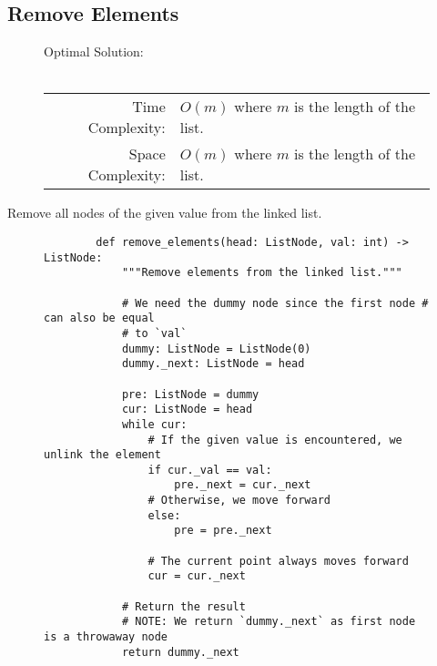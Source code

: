 
\subsection{Remove Elements}

\begin{figure}[H]
    Optimal Solution:\\\\
    \begin{tabular}{rl}
        Time Complexity:& \(O(m)\) where \(m\) is the length of the list.\\
        Space Complexity:& \(O(m)\) where \(m\) is the length of the list.
    \end{tabular}
\end{figure}

Remove all nodes of the given value from the linked list.

\begin{figure}[H]
    \centering
    \begin{verbatim}
        def remove_elements(head: ListNode, val: int) -> ListNode:
            """Remove elements from the linked list."""

            # We need the dummy node since the first node # can also be equal
            # to `val`
            dummy: ListNode = ListNode(0)
            dummy._next: ListNode = head

            pre: ListNode = dummy
            cur: ListNode = head
            while cur:
                # If the given value is encountered, we unlink the element
                if cur._val == val:
                    pre._next = cur._next
                # Otherwise, we move forward
                else:
                    pre = pre._next

                # The current point always moves forward
                cur = cur._next

            # Return the result
            # NOTE: We return `dummy._next` as first node is a throwaway node
            return dummy._next
    \end{verbatim}
\end{figure}
